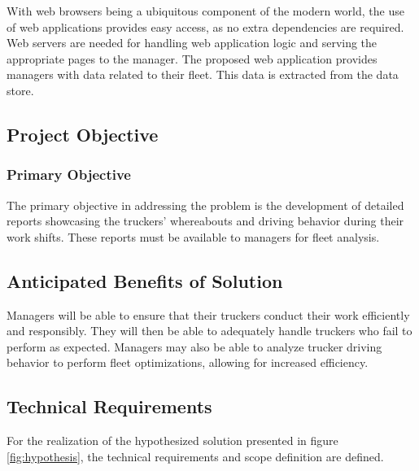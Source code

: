 With web browsers being a ubiquitous component of the modern world, the use of web applications provides easy access, as no extra dependencies are required.
Web servers are needed for handling web application logic and serving the appropriate pages to the manager.
The proposed web application provides managers with data related to their fleet.
This data is extracted from the data store.

\pagebreak
\subsection{Project Objective}
\subsubsection{Primary Objective}
The primary objective in addressing the problem is the development of detailed reports showcasing the truckers' whereabouts and driving behavior during their work shifts.
These reports must be available to managers for fleet analysis.

\subsection{Anticipated Benefits of Solution}
Managers will be able to ensure that their truckers conduct their work efficiently and responsibly.
They will then be able to adequately handle truckers who fail to perform as expected.
Managers may also be able to analyze trucker driving behavior to perform fleet optimizations, allowing for increased efficiency.

\subsection{Technical Requirements}
For the realization of the hypothesized solution presented in figure \ref{fig:hypothesis}, the technical requirements and scope definition are defined.

